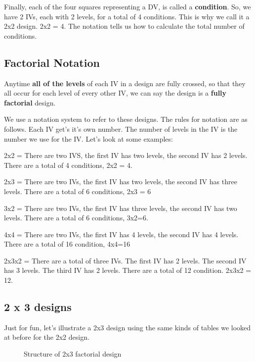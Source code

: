 \documentclass[
]{book}
\makeatletter
\newcommand*\pandocbounded[1]{%
  \sbox\pandoc@box{#1}%
  \Gscale@div\@tempa{\textheight}{\dimexpr\ht\pandoc@box+\dp\pandoc@box\relax}%
  \Gscale@div\@tempb{\linewidth}{\wd\pandoc@box}%
  \ifdim\@tempb\p@<\@tempa\p@\let\@tempa\@tempb\fi%
  \ifdim\@tempa\p@<\p@\scalebox{\@tempa}{\usebox\pandoc@box}%
  \else\usebox{\pandoc@box}%
  \fi%
}
\makeatother
\begin{document}
Finally, each of the four squares representing a DV, is called a \textbf{condition}. So, we have 2 IVs, each with 2 levels, for a total of 4 conditions. This is why we call it a 2x2 design. 2x2 = 4. The notation tells us how to calculate the total number of conditions.

\subsection{Factorial Notation}\label{factorial-notation}

Anytime \textbf{all of the levels} of each IV in a design are fully crossed, so that they all occur for each level of every other IV, we can say the design is a \textbf{fully factorial} design.

We use a notation system to refer to these designs. The rules for notation are as follows. Each IV get's it's own number. The number of levels in the IV is the number we use for the IV. Let's look at some examples:

2x2 = There are two IVS, the first IV has two levels, the second IV has 2 levels. There are a total of 4 conditions, 2x2 = 4.

2x3 = There are two IVs, the first IV has two levels, the second IV has three levels. There are a total of 6 conditions, 2x3 = 6

3x2 = There are two IVs, the first IV has three levels, the second IV has two levels. There are a total of 6 conditions, 3x2=6.

4x4 = There are two IVs, the first IV has 4 levels, the second IV has 4 levels. There are a total of 16 condition, 4x4=16

2x3x2 = There are a total of three IVs. The first IV has 2 levels. The second IV has 3 levels. The third IV has 2 levels. There are a total of 12 condition. 2x3x2 = 12.

\subsection{2 x 3 designs}\label{x-3-designs}

Just for fun, let's illustrate a 2x3 design using the same kinds of tables we looked at before for the 2x2 design.

\begin{figure}
\centering
\pandocbounded{\texttt{[image: figures/2x3Design.png]}}
\caption{\label{fig:923design}Structure of 2x3 factorial design}
\end{figure}
\end{document}
